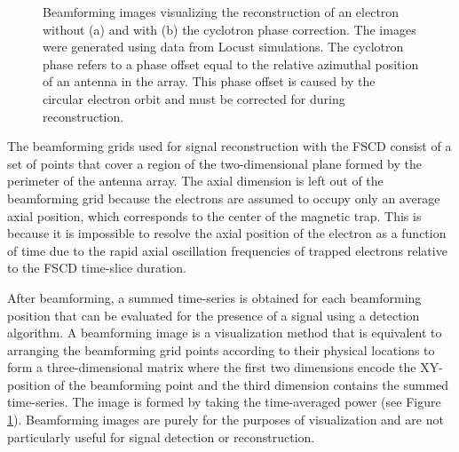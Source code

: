 \begin{figure}[htbp]
\begin{subfigure}{0.45\textwidth}
        \caption{}
    \end{subfigure}
    \caption{Beamforming images visualizing the reconstruction of an electron without (a) and with (b) the cyclotron phase correction. The images were generated using data from Locust simulations. The cyclotron phase refers to a phase offset equal to the relative azimuthal position of an antenna in the array. This phase offset is caused by the circular electron orbit and must be corrected for during reconstruction.}
    \label{fig:chap4-cyclotron-phase-bf-corr}
\end{figure}

The beamforming grids used for signal reconstruction with the FSCD consist of a set of points that cover a region of the two-dimensional plane formed by the perimeter of the antenna array. The axial dimension is left out of the beamforming grid because the electrons are assumed to occupy only an average axial position, which corresponds to the center of the magnetic trap. This is because it is impossible to resolve the axial position of the electron as a function of time due to the rapid axial oscillation frequencies of trapped electrons relative to the FSCD time-slice duration.

After beamforming, a summed time-series is obtained for each beamforming position that can be evaluated for the presence of a signal using a detection algorithm. A beamforming image is a visualization method that is equivalent to arranging the beamforming grid points according to their physical locations to form a three-dimensional matrix where the first two dimensions encode the XY-position of the beamforming point and the third dimension contains the summed time-series. The image is formed by taking the time-averaged power (see Figure \ref{fig:chap4-cyclotron-phase-bf-corr}). Beamforming images are purely for the purposes of visualization and are not particularly useful for signal detection or reconstruction.

